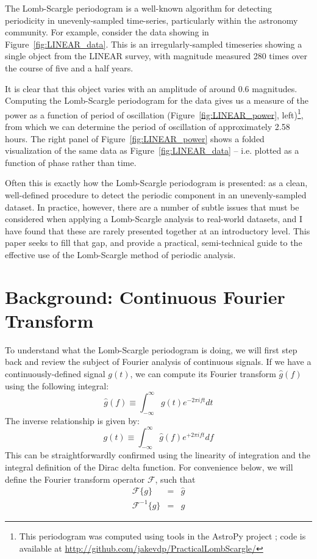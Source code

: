 \documentclass[preprint]{aastex}
\newcommand{\Fig}[1]{Figure~\ref{fig:#1}}
\newcommand{\fig}[1]{\Fig{#1}}
\newcommand{\eqlabel}[1]{\label{eq:#1}}
\begin{document}
The Lomb-Scargle periodogram \citep{Lomb76, Scargle82}
is a well-known algorithm for detecting periodicity
in unevenly-sampled time-series, particularly within the astronomy community.
For example, consider the data showing in \Fig{LINEAR_data}.
This is an irregularly-sampled timeseries showing a single object from the
LINEAR survey, with magnitude measured 280 times over the course of five and
a half years.

It is clear that this object varies with an amplitude of around 0.6 magnitudes.
Computing the Lomb-Scargle periodogram for the data gives us a measure of the
power as a function of period of oscillation (\fig{LINEAR_power}, left)\footnote{
This periodogram was computed using tools in the AstroPy project \citep{Astropy2013};
code is available at \url{http://github.com/jakevdp/PracticalLombScargle/}
}, from
which we can determine the period of oscillation of approximately 2.58 hours.
The right panel of \fig{LINEAR_power} shows a folded visualization of
the same data as \fig{LINEAR_data} -- i.e.{} plotted as a function of phase
rather than time.

Often this is exactly how the Lomb-Scargle periodogram is presented: as a clean,
well-defined procedure to detect the periodic component in an unevenly-sampled dataset.
In practice, however, there are a number of subtle issues that must be considered
when applying a Lomb-Scargle analysis to real-world datasets, and I have found
that these are rarely presented together at an introductory level.
This paper seeks to fill that gap, and provide a practical, semi-technical
guide to the effective use of the Lomb-Scargle method of periodic analysis.


\section{Background: Continuous Fourier Transform}

To understand what the Lomb-Scargle periodogram is doing, we will first step
back and review the subject of Fourier analysis of continuous signals.
If we have a continuously-defined signal $g(t)$, we can compute its Fourier
transform $\hat{g}(f)$ using the following integral:
\begin{equation}
    \hat{g}(f) \equiv \int_{-\infty}^\infty g(t) e^{-2\pi i f t} dt
    \eqlabel{FT-def}
\end{equation}
The inverse relationship is given by:
\begin{equation}
    g(t) \equiv \int_{-\infty}^\infty \hat{g}(f) e^{+2\pi i f t} df
    \eqlabel{IFT-def}
\end{equation}
This can be straightforwardly confirmed using the linearity of integration and
the integral definition of the Dirac delta function.
For convenience below, we will define the Fourier transform operator $\mathcal{F}$,
such that
\begin{eqnarray}
    \mathcal{F}\{g\} &=& \hat{g} \\
    \mathcal{F}^{-1}\{\hat{g}\} &=& g
\end{eqnarray}
\end{document}
